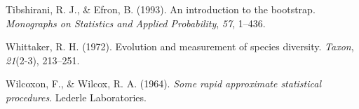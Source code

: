 \documentclass[11pt,]{article}
\begin{document}
\hypertarget{ref-tibshirani1993introduction}{}
Tibshirani, R. J., \& Efron, B. (1993). An introduction to the
bootstrap. \emph{Monographs on Statistics and Applied Probability},
\emph{57}, 1--436.

\hypertarget{ref-whittaker1972evolution}{}
Whittaker, R. H. (1972). Evolution and measurement of species diversity.
\emph{Taxon}, \emph{21}(2-3), 213--251.

\hypertarget{ref-wilcoxon1964some}{}
Wilcoxon, F., \& Wilcox, R. A. (1964). \emph{Some rapid approximate
statistical procedures}. Lederle Laboratories.




\newpage
\singlespacing 
\end{document}
